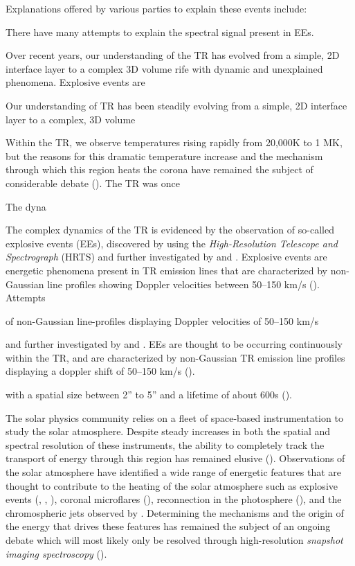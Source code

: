 \documentclass[10pt, letter]{article}
\begin{document}
			Explanations offered by various parties to explain these events include: 
			
			There have many attempts to explain the spectral signal present in EEs.
			
			Over recent years, our understanding of the TR has evolved from a simple, 2D interface layer to a complex 3D volume rife with dynamic and unexplained phenomena. Explosive events are 
			
			Our understanding of TR has been steadily evolving from a simple, 2D interface layer to a complex, 3D volume
			
			Within the TR, we observe temperatures rising rapidly from 20,000K to 1 MK, but the reasons for this dramatic temperature increase and the mechanism through which this region heats the corona have remained the subject of considerable debate (\cite{Innes2015}). The TR was once 
			
			The dyna
			
			The complex dynamics of the TR is evidenced by the observation of so-called explosive events (EEs), discovered by \cite{Brueckner1983} using the \textit{High-Resolution Telescope and Spectrograph} (HRTS) and further investigated by \cite{dere1989} and \cite{Dere1994}. Explosive events are energetic phenomena present in TR emission lines that are characterized by non-Gaussian line profiles showing Doppler velocities between 50--150 km/s (\cite{Brueckner1983}). Attempts
			
			of non-Gaussian line-profiles displaying Doppler velocities of 50--150 km/s
			
			
			 and further investigated by \cite{dere1989} and \cite{Dere1994}. EEs are thought to be occurring continuously within the TR, and are characterized by non-Gaussian TR emission line profiles displaying a doppler shift of 50--150 km/s (\cite{Brueckner1983}).
			
			with a spatial size between 2'' to 5'' and a lifetime of about 600s (\cite{dere1989}).
			
			
			
		
			The solar physics community relies on a fleet of space-based instrumentation to study the solar atmosphere. Despite steady increases in both the spatial and spectral resolution of these instruments, the ability to completely track the transport of energy through this region has remained elusive (\cite{Innes2013}). Observations of the solar atmosphere have identified a wide range of energetic features that are thought to contribute to the heating of the solar atmosphere such as explosive events (\cite{Brueckner1983}, \cite{dere1989}, \cite{Dere1994}), coronal microflares (\cite{Krucker2000}), reconnection in the photosphere (\cite{Tarbell1999}), and the chromospheric jets observed by \cite{DePontieu2011}. Determining the mechanisms and the origin of the energy that drives these features has remained the subject of an ongoing debate which will most likely only be resolved through high-resolution \textit{snapshot imaging spectroscopy} (\cite{Innes2013}).
			
\end{document}
